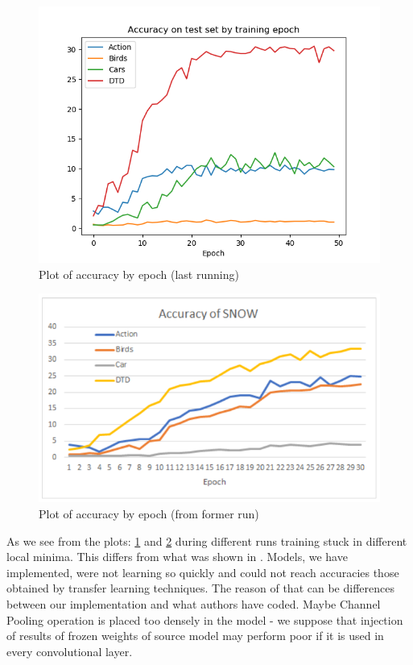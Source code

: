 \documentclass[12pt]{article}
\begin{document}
    \begin{figure}
        \centering
        \includegraphics[width=\linewidth]{accs}
        \caption{Plot of accuracy by epoch (last running)}
        \label{fig:accs}
    \end{figure}


    \begin{figure}
        \centering
        \includegraphics[width=\linewidth]{accs_old}
        \caption{Plot of accuracy by epoch (from former run)}
        \label{fig:accs2}
    \end{figure}

    As we see from the plots: \ref{fig:accs} and \ref{fig:accs2} during different runs training stuck in different local minima.
    This differs from what was shown in \cite{paper}.
    Models, we have implemented, were not learning so quickly and could not reach accuracies those obtained by transfer learning techniques.
    The reason of that can be differences between our implementation and what authors have coded.
    Maybe Channel Pooling operation is placed too densely in the model - we suppose that injection of results of frozen weights of source model may perform poor if it is used in every convolutional layer.
\end{document}
